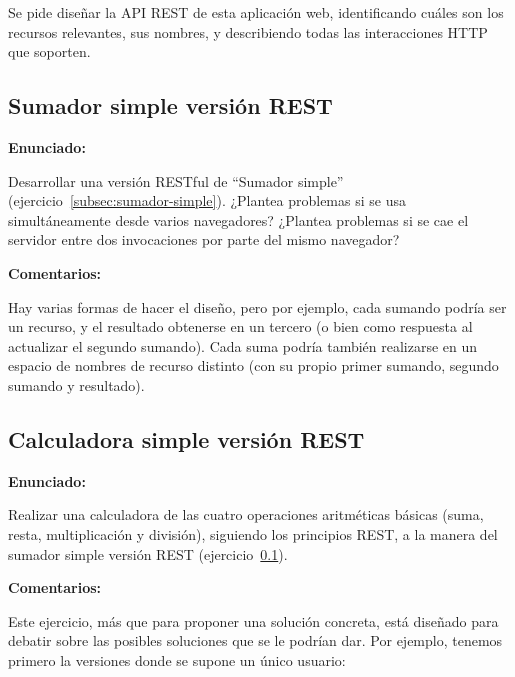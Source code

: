 Se pide diseñar la API REST de esta aplicación web, identificando cuáles son los recursos relevantes, sus nombres, y describiendo todas las interacciones HTTP que soporten.

\subsection{Sumador simple versión REST}
\label{subsec:sumador-simple-rest}

\textbf{Enunciado:}

Desarrollar una versión RESTful de ``Sumador simple'' (ejercicio~\ref{subsec:sumador-simple}). ¿Plantea problemas si se usa simultáneamente desde varios navegadores? ¿Plantea problemas si se cae el servidor entre dos invocaciones por parte del mismo navegador?

\textbf{Comentarios:}

Hay varias formas de hacer el diseño, pero por ejemplo, cada sumando podría ser un recurso, y el resultado obtenerse en un tercero (o bien como respuesta al actualizar el segundo sumando). Cada suma podría también realizarse en un espacio de nombres de recurso distinto (con su propio primer sumando, segundo sumando y resultado).


\subsection{Calculadora simple versión REST}
\label{subsec:calc-simple-rest}

\textbf{Enunciado:}

Realizar una calculadora de las cuatro operaciones aritméticas básicas (suma, resta, multiplicación y división), siguiendo los principios REST, a la manera del sumador simple versión REST (ejercicio~\ref{subsec:sumador-simple-rest}).

\textbf{Comentarios:}

Este ejercicio, más que para proponer una solución concreta, está diseñado para debatir sobre las posibles soluciones que se le podrían dar. Por ejemplo, tenemos primero la versiones donde se supone un único usuario:

